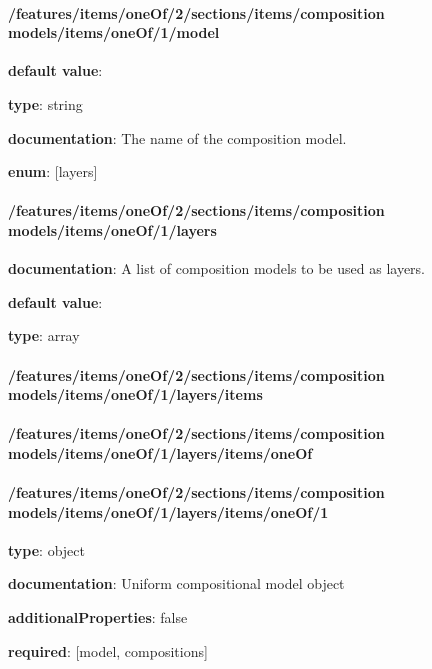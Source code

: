 \paragraph{/features/items/oneOf/2/sections/items/composition models/items/oneOf/1/model} \begin{itemized}
\item {\bf default value}: 
\item {\bf type}: string
\item {\bf documentation}: The name of the composition model.
\item {\bf enum}: [layers]\end{itemized}\paragraph{/features/items/oneOf/2/sections/items/composition models/items/oneOf/1/layers} \begin{itemized}
\item {\bf documentation}: A list of composition models to be used as layers.
\item {\bf default value}: 
\item {\bf type}: array
\paragraph{/features/items/oneOf/2/sections/items/composition models/items/oneOf/1/layers/items} \begin{itemized}
\end{itemized}\end{itemized}\paragraph{/features/items/oneOf/2/sections/items/composition models/items/oneOf/1/layers/items/oneOf} \begin{itemized}
\end{itemized}\paragraph{/features/items/oneOf/2/sections/items/composition models/items/oneOf/1/layers/items/oneOf/1} \begin{itemized}
\item {\bf type}: object
\item {\bf documentation}: Uniform compositional model object
\item {\bf additionalProperties}: false
\item {\bf required}: [model, compositions]\end{itemized}
